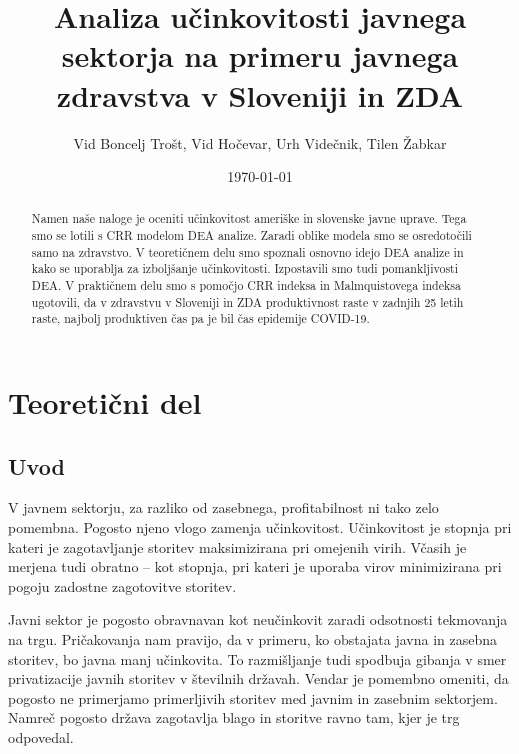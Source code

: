 \documentclass[12pt,a4paper]{article}
\theoremstyle{definition}
\begin{document}
\setlength{\parskip}{1em}
\setlength{\parindent}{0pt}

\title{Analiza učinkovitosti javnega sektorja na primeru javnega zdravstva v Sloveniji in ZDA}
\author{Vid Boncelj Trošt, Vid Hočevar, Urh Videčnik, Tilen Žabkar}
\date{\today}
\maketitle

\begin{abstract}
    Namen naše naloge je oceniti učinkovitost ameriške in slovenske javne
    uprave. Tega smo se lotili s CRR modelom DEA analize. Zaradi oblike modela
    smo se osredotočili samo na zdravstvo. V teoretičnem
    delu smo spoznali osnovno idejo DEA analize in kako se uporablja za 
    izboljšanje učinkovitosti. Izpostavili smo tudi pomankljivosti DEA. 
    V praktičnem delu smo s pomočjo CRR indeksa in Malmquistovega indeksa
    ugotovili, da v zdravstvu v Sloveniji in ZDA produktivnost raste v zadnjih
    25 letih raste, najbolj produktiven čas pa je bil čas epidemije COVID-19. 
\end{abstract}

\newpage

\begingroup
\setlength{\parskip}{5pt}
\tableofcontents
\endgroup

\newpage

\section{Teoretični del}

\subsection{Uvod}

V javnem sektorju, za razliko od zasebnega, profitabilnost
ni tako zelo pomembna. Pogosto njeno vlogo zamenja učinkovitost. 
Učinkovitost je stopnja pri kateri je zagotavljanje storitev maksimizirana pri omejenih 
virih. Včasih je merjena tudi obratno -- kot stopnja, pri kateri je uporaba virov 
minimizirana pri pogoju zadostne zagotovitve storitev. 

Javni sektor je pogosto obravnavan kot neučinkovit zaradi odsotnosti
tekmovanja na trgu. Pričakovanja nam pravijo, da v primeru, ko obstajata
javna in zasebna storitev, bo javna manj učinkovita. To razmišljanje tudi
spodbuja gibanja v smer privatizacije javnih storitev v številnih državah.
Vendar je pomembno omeniti, da pogosto ne primerjamo primerljivih
storitev med javnim in zasebnim sektorjem. Namreč 
pogosto država zagotavlja blago in storitve ravno tam, kjer je trg odpovedal.
\cite{Lovell2002}
\end{document}
